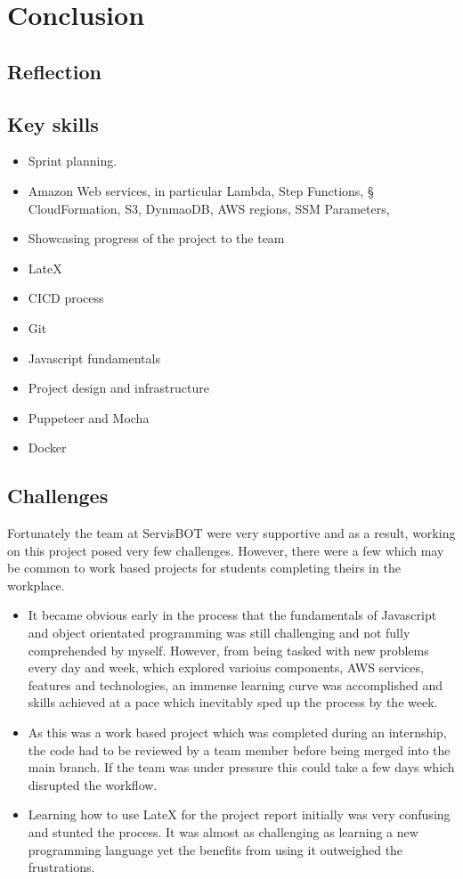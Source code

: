 \documentclass[12pt,a4paper,titlepage]{report}
\begin{document}
\chapter{Conclusion}
\section{Reflection}
\section{Key skills}
\begin{itemize}
  \item Sprint planning. 
  \item Amazon Web services, in particular Lambda, Step Functions, § CloudFormation, S3, DynmaoDB, AWS regions, SSM Parameters, 
  \item Showcasing progress of the project to the team
  \item LateX
  \item CICD process
  \item Git
  \item Javascript fundamentals
  \item Project design and infrastructure 
  \item Puppeteer and Mocha
  \item Docker
\end{itemize}
\section{Challenges}
Fortunately the team at ServisBOT were very supportive and as a result, working on this project posed very few challenges. However, there 
were a few which may be common to work based projects for students completing theirs in the workplace.
\begin{itemize}
  \item It became obvious early in the process that the fundamentals of Javascript and object orientated programming was still challenging and not fully comprehended by myself. However, from being tasked with new problems every day and week, which explored 
  varioius components, AWS services, features and technologies, an immense learning curve was accomplished and skills achieved at a pace which inevitably sped up the process by the week.
  \item As this was a work based project which was completed during an internship, the code had to be reviewed by a team member before being merged into the main branch. If the team was under pressure this could take a few days which disrupted the workflow.
  \item Learning how to use LateX for the project report initially was very confusing and stunted the process. It was almost as challenging as learning a new programming language yet the benefits from using it outweighed the frustrations.
\end{itemize}
\end{document}
